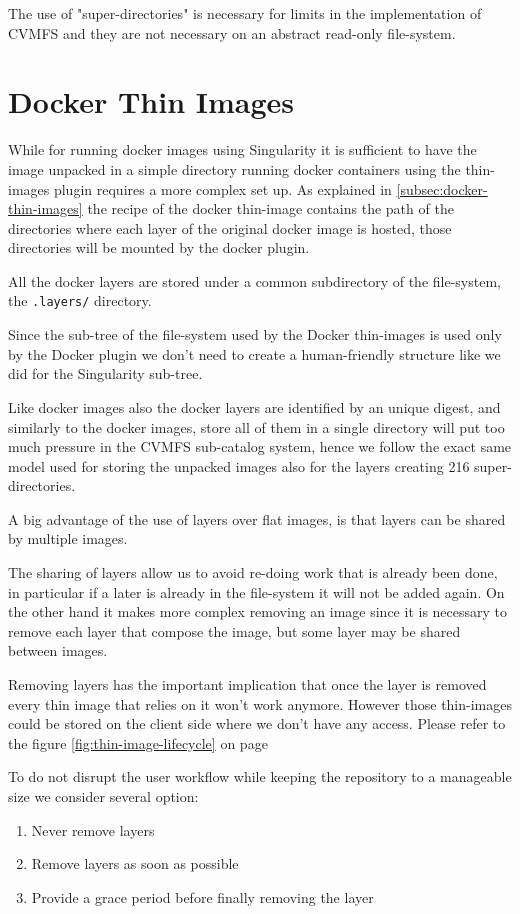 The use of "super-directories" is necessary for limits in the implementation of
CVMFS and they are not necessary on an abstract read-only file-system.

\section{Docker Thin Images}

While for running docker images using Singularity it is sufficient to have the
image unpacked in a simple directory running docker containers using the
thin-images plugin requires a more complex set up.  As explained in
\ref{subsec:docker-thin-images} the recipe of the docker thin-image contains
the path of the directories where each layer of the original docker image is
hosted, those directories will be mounted by the docker plugin.

All the docker layers are stored under a common subdirectory of the
file-system, the \texttt{.layers/} directory.

Since the sub-tree of the file-system used by the Docker thin-images is used only
by the Docker plugin we don't need to create a human-friendly structure like we
did for the Singularity sub-tree.

Like docker images also the docker layers are identified by an unique digest,
and similarly to the docker images, store all of them in a single directory
will put too much pressure in the CVMFS sub-catalog system, hence we follow the
exact same model used for storing the unpacked images also for the layers
creating 216 super-directories.

A big advantage of the use of layers over flat images, is that layers can be
shared by multiple images.

The sharing of layers allow us to avoid re-doing work that is already been
done, in particular if a later is already in the file-system it will not be
added again. On the other hand it makes more complex removing an image since it
is necessary to remove each layer that compose the image, but some layer may be
shared between images.

Removing layers has the important implication that once the layer is removed
every thin image that relies on it won’t work anymore.  However those
thin-images could be stored on the client side where we don’t have any access.
Please refer to the figure \ref{fig:thin-image-lifecycle} on page
\pageref{fig:thin-image-lifecycle}

To do not disrupt the user workflow while keeping the repository to a manageable
size we consider several option: 
\begin{enumerate}
\item Never remove layers
\item Remove layers as soon as possible
\item Provide a grace period before finally removing the layer
\end{enumerate}

